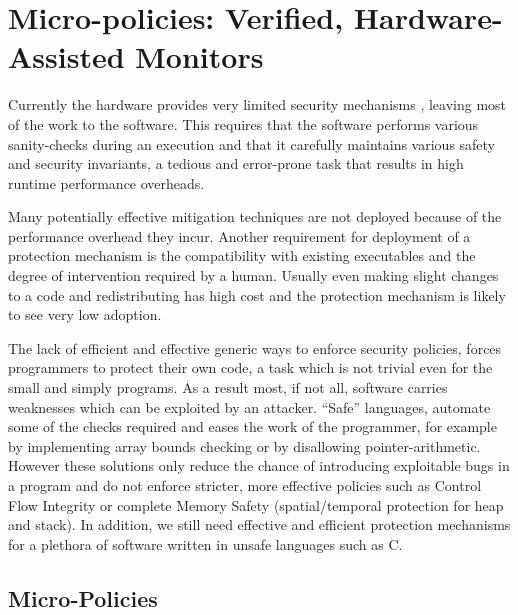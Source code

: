 \chapter{Micro-policies: Verified, Hardware-Assisted Monitors}\label{ch:policies}
Currently the hardware provides very limited security mechanisms ,
leaving most of the work to the software. This requires that the software
performs various sanity-checks during an execution and that it carefully
maintains various safety and security invariants, a tedious and error-prone task
that results in high runtime performance overheads.

Many potentially effective mitigation techniques are not deployed because of the
performance overhead they incur. Another requirement for deployment of a
protection mechanism is the compatibility with existing executables and
the degree of intervention required by a human.
Usually even making slight changes to a code and redistributing has high cost
and the protection mechanism is likely to see very low adoption.

The lack of efficient and effective generic ways to enforce security policies,
forces programmers to protect their own code, a task which is not trivial even
for the small and simply programs. As a result most, if not all, software
carries weaknesses which can be exploited by an attacker. ``Safe'' languages,
automate some of the checks required and eases the work of the programmer,
for example by implementing array bounds checking or by disallowing
pointer-arithmetic. However these solutions only reduce the chance of
introducing exploitable bugs in a program and do not enforce stricter,
more effective policies such as Control Flow Integrity
or complete Memory Safety (spatial/temporal protection for heap and stack).
In addition, we still need effective and efficient protection mechanisms for a
plethora of software written in unsafe languages such as C.

\section{Micro-Policies}\label{sec:micropolicies}



